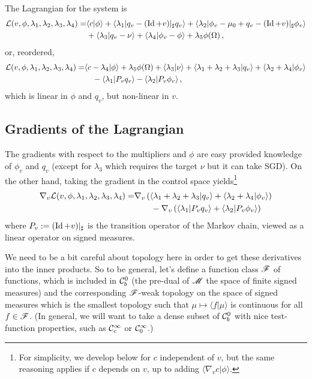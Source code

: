 \documentclass[twoside,10pt]{../jmlr}
\begin{document}
The Lagrangian for the system is 
\begin{align}
    \mathcal{L}(v,\phi,\lambda_1,\lambda_2,\lambda_3,\lambda_4)=&\langle c\vert\phi\rangle+\langle \lambda_1\vert q_v-(\operatorname{Id}+v)\vert_\sharp q_v\rangle+\langle \lambda_2\vert \phi_v-\mu_0+q_v-(\operatorname{Id}+v)\vert_\sharp \phi_v\rangle\notag\\
    &+\langle \lambda_3\vert q_v-\nu\rangle+\langle \lambda_4\vert \phi_v-\phi\rangle+\lambda_5\phi(\Omega)\,,
\end{align}
or, reordered,
\begin{align}
    \mathcal{L}(v,\phi,\lambda_1,\lambda_2,\lambda_3,\lambda_4)=&\langle c-\lambda_4\vert\phi\rangle+\lambda_5\phi(\Omega) + \langle \lambda_3\vert\nu\rangle+ \langle  \lambda_1+\lambda_2+\lambda_3\vert q_v\rangle+ \langle \lambda_2+\lambda_4\vert \phi_v\rangle \notag\\
    &\quad- \langle \lambda_1 \vert P_vq_v\rangle -\langle \lambda_2 \vert P_v\phi_v\rangle\,,\label{eq: lagrangian with measures}
\end{align}
which is linear in $\phi$ and $q_v$, but non-linear in $v$.

\subsection{Gradients of the Lagrangian}

The gradients with respect to the multipliers and $\phi$ are easy provided knowledge of $\phi_v$ and $q_v$ (except for $\lambda_3$ which requires the target $\nu$ but it can take SGD). On the other hand, taking the gradient in the control space yields\footnote{For simplicity, we develop below for $c$ independent of $v$, but the same reasoning applies if $c$ depends on $v$, up to adding $\langle \nabla_v c\vert \phi\rangle$.}
\begin{align}
    \nabla_v \mathcal{L}(v,\phi,\lambda_1,\lambda_2,\lambda_3,\lambda_4)=&\nabla_v\left(\langle  \lambda_1+\lambda_2+\lambda_3\vert q_v\rangle+ \langle \lambda_2+\lambda_4\vert \phi_v\rangle\right)\notag\\
    &\qquad-\nabla_v\left(\langle \lambda_1 \vert P_vq_v\rangle +\langle \lambda_2 \vert P_v\phi_v\rangle\right) 
\end{align}
where $P_v:=(\operatorname{Id}+v)\vert_\sharp$ is the transition operator of the Markov chain, viewed as a linear operator on signed measures.

We need to be a bit careful about topology here in order to get these derivatives into the inner products. So to be general, let's define a function class $\mathscr{F}$ of functions, which is included in $\mathcal{C}^0_b$ (the pre-dual of $\mathscr{M}$ the space of finite signed measures) and the corresponding $\mathscr{F}$-weak topology on the space of signed measures which is the smallest topology such that $\mu\mapsto \langle f\vert \mu\rangle$ is continuous for all $f\in\mathscr{F}$. (In general, we will want to take a dense subset of $\mathcal{C}^0_b$ with nice test-function properties, such as $\mathcal{C}^\infty_c$ or $\mathcal{C}^\infty_0$.)
\end{document}
